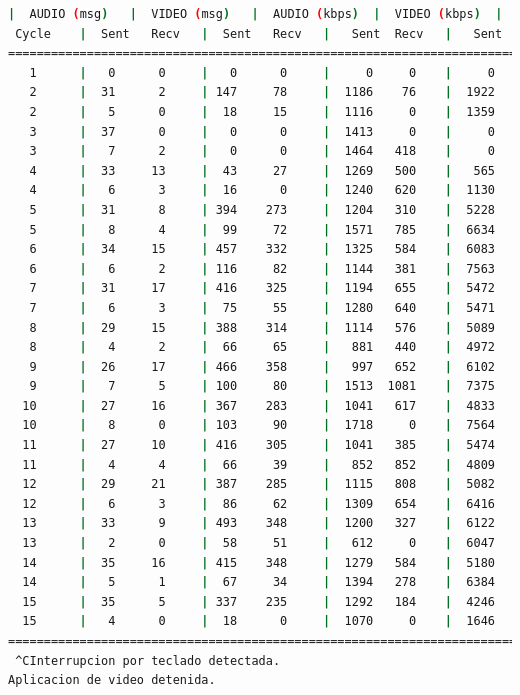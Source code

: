 \begin{lstlisting}[language=bash,basicstyle=\ttfamily\scriptsize]
          |  AUDIO (msg)   |  VIDEO (msg)   |  AUDIO (kbps)  |  VIDEO (kbps)  |   CPU (%)
 Cycle    |  Sent   Recv   |  Sent   Recv   |   Sent  Recv   |   Sent  Recv   | Program System
============================================================================================
   1      |   0      0     |   0      0     |     0     0    |     0     0    |   0      0
   2      |  31      2     | 147     78     |  1186    76    |  1922   1020   |  24     67
   2      |   5      0     |  18     15     |  1116     0    |  1359   1145   |  27     72
   3      |  37      0     |   0      0     |  1413     0    |     0      0   |  33     75
   3      |   7      2     |   0      0     |  1464   418    |     0      0   |  44     75
   4      |  33     13     |  43     27     |  1269   500    |   565    352   |  39     79
   4      |   6      3     |  16      0     |  1240   620    |  1130      0   |  37     78
   5      |  31      8     | 394    273     |  1204   310    |  5228   3621   |  40     75
   5      |   8      4     |  99     72     |  1571   785    |  6634   4834   |  47     75
   6      |  34     15     | 457    332     |  1325   584    |  6083   4420   |  33     72
   6      |   6      2     | 116     82     |  1144   381    |  7563   5334   |  23     74
   7      |  31     17     | 416    325     |  1194   655    |  5472   4276   |  25     70
   7      |   6      3     |  75     55     |  1280   640    |  5471   3998   |  26     71
   8      |  29     15     | 388    314     |  1114   576    |  5089   4122   |  37     73
   8      |   4      2     |  66     65     |   881   440    |  4972   4882   |  26     73
   9      |  26     17     | 466    358     |   997   652    |  6102   4691   |  39     74
   9      |   7      5     | 100     80     |  1513  1081    |  7375   5911   |  46     74
  10      |  27     16     | 367    283     |  1041   617    |  4833   3723   |  32     73
  10      |   8      0     | 103     90     |  1718     0    |  7564   6609   |  26     72
  11      |  27     10     | 416    305     |  1041   385    |  5474   4011   |  30     70
  11      |   4      4     |  66     39     |   852   852    |  4809   2842   |  13     71
  12      |  29     21     | 387    285     |  1115   808    |  5082   3743   |  30     80
  12      |   6      3     |  86     62     |  1309   654    |  6416   4625   |  13     79
  13      |  33      9     | 493    348     |  1200   327    |  6122   4322   |  35     71
  13      |   2      0     |  58     51     |   612     0    |  6047   5335   |  18     70
  14      |  35     16     | 415    348     |  1279   584    |  5180   4340   |  29     79
  14      |   5      1     |  67     34     |  1394   278    |  6384   3221   |  51     78
  15      |  35      5     | 337    235     |  1292   184    |  4246   2963   |  24     71
  15      |   4      0     |  18      0     |  1070     0    |  1646      0   |  32     71
============================================================================================
 ^CInterrupcion por teclado detectada.
Aplicacion de video detenida.


\end{lstlisting}
